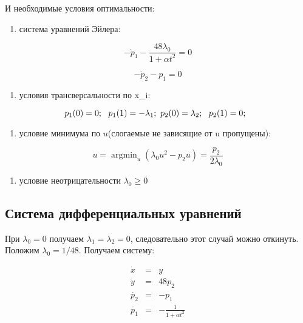 \documentclass[11pt]{article}
\providecommand{\tightlist}{%
      \setlength{\itemsep}{0pt}\setlength{\parskip}{0pt}}
\begin{document}
    И необходимые условия оптимальности:

\begin{enumerate}
\def\labelenumi{\arabic{enumi})}
\tightlist
\item
  система уравнений Эйлера:
\end{enumerate}

\[- \dot{p}_1 - \frac{48\lambda_0}{1+ \alpha t^2} = 0\]

\[-\dot{p}_2 - p_1 = 0\]

\begin{enumerate}
\def\labelenumi{\arabic{enumi})}
\setcounter{enumi}{1}
\tightlist
\item
  условия трансверсальности по x\_i:
\end{enumerate}

\[p_1(0) = 0; \ \ p_1(1) = -\lambda_1; \ \ \\
p_2(0) = \lambda_2; \ \ p_2(1) = 0; \ \ \]

\begin{enumerate}
\def\labelenumi{\arabic{enumi})}
\setcounter{enumi}{2}
\tightlist
\item
  условие минимума по \(u\)(слогаемые не зависящие от u пропущены):
\end{enumerate}

\[u = \operatorname{argmin}_{u} (\lambda_0 u^2 - p_2 u) = \frac{p_2}{2\lambda_0}\]

\begin{enumerate}
\def\labelenumi{\arabic{enumi})}
\setcounter{enumi}{3}
\tightlist
\item
  условие неотрицательности \(\lambda_0 \ge 0\)
\end{enumerate}

    \hypertarget{ux441ux438ux441ux442ux435ux43cux430-ux434ux438ux444ux444ux435ux440ux435ux43dux446ux438ux430ux43bux44cux43dux44bux445-ux443ux440ux430ux432ux43dux435ux43dux438ux439}{%
\subsection{Система дифференциальных
уравнений}\label{ux441ux438ux441ux442ux435ux43cux430-ux434ux438ux444ux444ux435ux440ux435ux43dux446ux438ux430ux43bux44cux43dux44bux445-ux443ux440ux430ux432ux43dux435ux43dux438ux439}}

    При \(\lambda_0=0\) получаем \(\lambda_1 = \lambda_2 = 0\),
следовательно этот случай можно откинуть. Положим \(\lambda_0 = 1/48\).
Получаем систему:

$$\begin{matrix}
\dot{x}  &=& y \\ 
\dot{y} &=& 48 p_2 \\
\dot{p_2} &=& - p_1\\
\dot{p_1}  &=& - \frac{1}{1+\alpha t^2} \\
\end{matrix}$$
\end{document}
